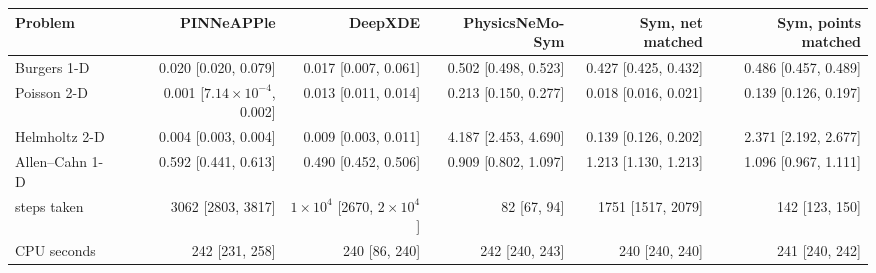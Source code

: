 \begin{tabular}{lrrrrr}
\toprule
Problem & PINNeAPPle & DeepXDE & PhysicsNeMo-Sym & Sym, net matched & Sym, points matched \\
\midrule
Burgers 1-D & 0.020 [0.020, 0.079] & 0.017 [0.007, 0.061] & 0.502 [0.498, 0.523] & 0.427 [0.425, 0.432] & 0.486 [0.457, 0.489] \\
Poisson 2-D & 0.001 [$7.14\times10^{-4}$, 0.002] & 0.013 [0.011, 0.014] & 0.213 [0.150, 0.277] & 0.018 [0.016, 0.021] & 0.139 [0.126, 0.197] \\
Helmholtz 2-D & 0.004 [0.003, 0.004] & 0.009 [0.003, 0.011] & 4.187 [2.453, 4.690] & 0.139 [0.126, 0.202] & 2.371 [2.192, 2.677] \\
Allen--Cahn 1-D & 0.592 [0.441, 0.613] & 0.490 [0.452, 0.506] & 0.909 [0.802, 1.097] & 1.213 [1.130, 1.213] & 1.096 [0.967, 1.111] \\
\midrule
steps taken & 3062 [2803, 3817] & $1\times10^{4}$ [2670, $2\times10^{4}$] & 82 [67, 94] & 1751 [1517, 2079] & 142 [123, 150] \\
CPU seconds & 242 [231, 258] & 240 [86, 240] & 242 [240, 243] & 240 [240, 240] & 241 [240, 242] \\
\bottomrule
\end{tabular}
